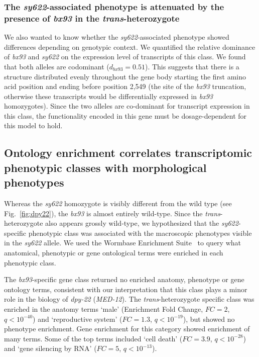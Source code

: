 \documentclass[10pt, twocolumn]{article}
\newcommand{\qval}[1]{$q<10^{-#1}$}
\newcommand{\gene}[1]{\mbox{\emph{#1}}}
\newcommand{\dpy}{\gene{dpy-22} (\emph{MED-12})}
\begin{document}
\subsubsection*{The \emph{sy622}-associated phenotype is attenuated by the presence
            of \emph{bx93} in the \emph{trans}-heterozygote}
We also wanted to know whether the \emph{sy622}-associated phenotype showed
differences depending on genotypic context. We quantified the relative dominance
of \emph{bx93} and \emph{sy622} on the expression level of transcripts of this
class. We found that both alleles are codominant ($d_{bx93} = 0.51$). This
suggests that there is a structure distributed evenly throughout the gene
body starting the first amino acid position and ending before position 2,549
(the site of the \emph{bx93} truncation, otherwise these transcripts would be
differentially expressed in \emph{bx93} homozygotes). Since the two alleles are
co-dominant for transcript expression in this class, the functionality encoded
in this gene must be dosage-dependent for this model to hold.

\subsection*{Ontology enrichment correlates transcriptomic phenotypic classes
             with morphological phenotypes}
Whereas the \emph{sy622} homozygote is visibly different from the wild type (see
Fig.~\ref{fig:dpy22}), the \emph{bx93} is almost entirely wild-type. Since the
\emph{trans}-heterozygote also appears grossly wild-type, we hypothesized that the
\emph{sy622}-specific phenotypic class was associated with the macroscopic
phenotypes visible in the \emph{sy622} allele. We used the Wormbase Enrichment
Suite~\cite{Angeles-Albores2016,Angeles-Albores106369} to query what anatomical,
phenotypic or gene ontological terms were enriched in each phenotypic class.

The \emph{bx93}-specific gene class returned no enriched anatomy, phenotype
or gene ontology terms, consistent with our interpretation that this class plays
a minor role in the biology of \dpy{}. The \emph{trans}-heterozygote specific
class was enriched in the anatomy terms `male' (Enrichment Fold Change, $FC=2$,
\qval{40}) and `reproductive system' ($FC=1.3$, \qval{19}), but showed no
phenotype enrichment. Gene enrichment for this category showed enrichment of many
terms. Some of the top terms included `cell death' ($FC=3.9$, \qval{28}) and
`gene silencing by RNA' ($FC=5$, \qval{13}).
\end{document}
